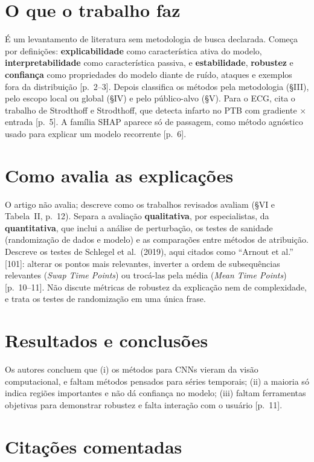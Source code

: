 \documentclass[11pt,a4paper]{article}
\begin{document}
\section{O que o trabalho faz}
É um levantamento de literatura sem metodologia de busca declarada. Começa por definições: \textbf{explicabilidade} como característica ativa do modelo, \textbf{interpretabilidade} como característica passiva, e \textbf{estabilidade}, \textbf{robustez} e \textbf{confiança} como propriedades do modelo diante de ruído, ataques e exemplos fora da distribuição [p.~2--3]. Depois classifica os métodos pela metodologia (§III), pelo escopo local ou global (§IV) e pelo público-alvo (§V). Para o ECG, cita o trabalho de Strodthoff e Strodthoff, que detecta infarto no PTB com gradiente $\times$ entrada [p.~5]. A família SHAP aparece só de passagem, como método agnóstico usado para explicar um modelo recorrente [p.~6].

\section{Como avalia as explicações}
O artigo não avalia; descreve como os trabalhos revisados avaliam (§VI e Tabela~II, p.~12). Separa a avaliação \textbf{qualitativa}, por especialistas, da \textbf{quantitativa}, que inclui a análise de perturbação, os testes de sanidade (randomização de dados e modelo) e as comparações entre métodos de atribuição. Descreve os testes de Schlegel et al.\ (2019), aqui citados como “Arnout et al.” [101]: alterar os pontos mais relevantes, inverter a ordem de subsequências relevantes (\textit{Swap Time Points}) ou trocá-las pela média (\textit{Mean Time Points}) [p.~10--11]. Não discute métricas de robustez da explicação nem de complexidade, e trata os testes de randomização em uma única frase.

\section{Resultados e conclusões}
Os autores concluem que (i) os métodos para CNNs vieram da visão computacional, e faltam métodos pensados para séries temporais; (ii) a maioria só indica regiões importantes e não dá confiança no modelo; (iii) faltam ferramentas objetivas para demonstrar robustez e falta interação com o usuário [p.~11].

\section{Citações comentadas}
\end{document}
